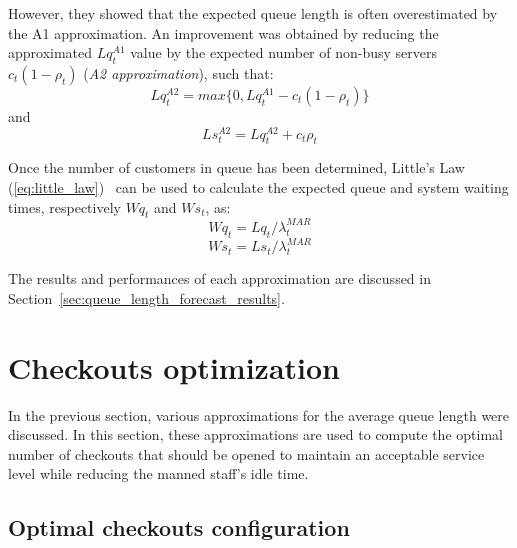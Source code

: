 However, they showed that the expected queue length is often overestimated by the A1 approximation. An improvement was obtained by reducing the approximated \( Lq_t^{A1} \) value by the expected number of non-busy servers \( c_t (1 - \rho_t) \) (\emph{A2 approximation}), such that:
\begin{equation}
  Lq_t^{A2} = max\{0, Lq_t^{A1} - c_t (1 - \rho_t)\}
\end{equation}
and
\begin{equation}
  Ls_t^{A2} = Lq_t^{A2} + c_t \rho_t
\end{equation}

Once the number of customers in queue has been determined, Little’s Law (\ref{eq:little_law})~\cite{little} can be used to calculate the expected queue and system waiting times, respectively \( Wq_t \) and \( Ws_t \), as:
\begin{equation}
  Wq_t = Lq_t / \lambda^{MAR}_t
\end{equation}
\begin{equation}
  Ws_t = Ls_t / \lambda^{MAR}_t
\end{equation}

The results and performances of each approximation are discussed in Section~\ref{sec:queue_length_forecast_results}.

\section{Checkouts optimization}
\label{sec:checkouts_optimization}

In the previous section, various approximations for the average queue length were discussed. In this section, these approximations are used to compute the optimal number of checkouts that should be opened to maintain an acceptable service level while reducing the manned staff’s idle time.

\subsection{Optimal checkouts configuration}
\label{subsec:optimal_checkouts_configuration}

